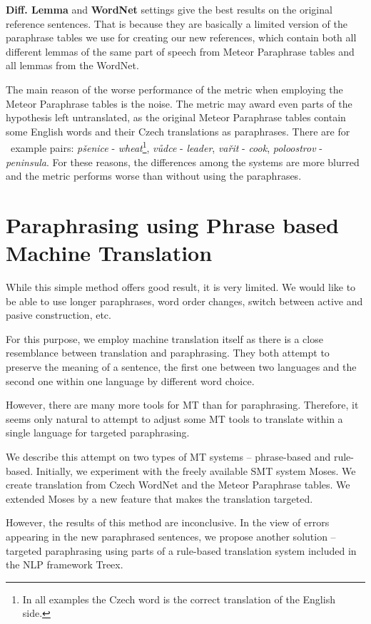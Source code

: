 \documentclass[11pt]{article}
\begin{document}
\textbf{Diff. Lemma} and \textbf{WordNet} settings give the best results on the 
original reference sentences. That is because they are basically a limited 
version of the paraphrase tables we use for creating our new references, which 
contain both all different lemmas of the same part of speech from Meteor 
Paraphrase tables and all lemmas from the WordNet.

The main reason of the worse performance of the metric when employing the 
Meteor Paraphrase tables is the noise. The metric may award even parts of the 
hypothesis left untranslated, as the original Meteor Paraphrase tables contain 
some English words and their Czech translations as paraphrases. There are for
~example pairs: \textit{pšenice} - \textit{wheat}\footnote{In all examples the 
Czech word is the correct translation of the English side.}, \textit{vůdce} - 
\textit{leader}, \textit{vařit} -	\textit{cook}, \textit{poloostrov} - 
\textit{peninsula}. For these reasons, the differences among the systems are 
more blurred and the metric performs worse than without using the paraphrases. 

\section{Paraphrasing using Phrase based Machine Translation}
\label{MT}
While this simple method offers good result, it is very limited. We would like
to be able to use longer paraphrases, word order changes, switch between active 
and pasive construction, etc.

For this purpose, we employ machine translation itself as there is a close 
resemblance between translation and paraphrasing. They both attempt to preserve 
the meaning of a sentence, the first one between two languages and the second 
one within one language by different word choice. %

However, there are many more tools for MT than for paraphrasing. Therefore, it 
seems only natural to attempt to adjust some MT tools to translate within a 
single language for targeted paraphrasing. 

We describe this attempt on two types of MT systems -- phrase-based and 
rule-based. Initially, we experiment with the freely available SMT system 
Moses.\cite{moses} We create translation from Czech WordNet and the Meteor 
Paraphrase tables. We extended Moses by a new feature that makes the 
translation targeted. 

However, the results of this method are inconclusive. In the view of errors 
appearing in the new paraphrased sentences, we propose another solution -- 
targeted paraphrasing using parts of a rule-based translation system included 
in the NLP framework Treex.
\end{document}

